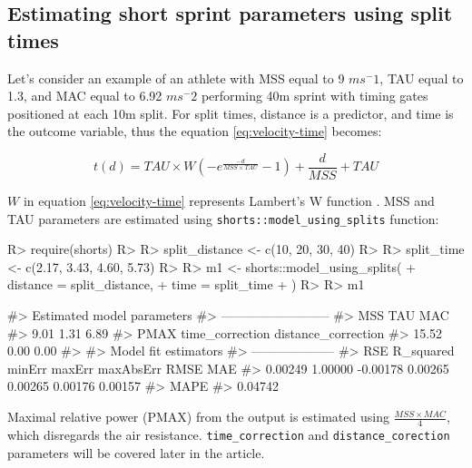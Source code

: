 \documentclass[
]{jss}
\begin{document}
\hypertarget{estimating-short-sprint-parameters-using-split-times}{%
\subsection{Estimating short sprint parameters using split times}\label{estimating-short-sprint-parameters-using-split-times}}

Let's consider an example of an athlete with MSS equal to 9 \(ms^-1\), TAU equal to 1.3, and MAC equal to 6.92 \(ms^-2\) performing 40m sprint with timing gates positioned at each 10m split. For split times, distance is a predictor, and time is the outcome variable, thus the equation \eqref{eq:velocity-time} becomes:

\begin{equation}
  t(d) = TAU \times W(-e^{\frac{-d}{MSS \times TAU}} - 1) + \frac{d}{MSS} + TAU \label{eq:time-distance}
\end{equation}

\(W\) in equation \eqref{eq:velocity-time} represents Lambert's W function \citep{R-LambertW}. MSS and TAU parameters are estimated using \texttt{shorts::model\_using\_splits} function:

\begin{CodeChunk}
\begin{CodeInput}
R> require(shorts)
R> 
R> split_distance <- c(10, 20, 30, 40)
R> 
R> split_time <- c(2.17, 3.43, 4.60, 5.73)
R> 
R> m1 <- shorts::model_using_splits(
+   distance = split_distance,
+   time = split_time
+ )
R> 
R> m1
\end{CodeInput}
\begin{CodeOutput}
#> Estimated model parameters
#> --------------------------
#>                 MSS                 TAU                 MAC 
#>                9.01                1.31                6.89 
#>                PMAX     time_correction distance_correction 
#>               15.52                0.00                0.00 
#> 
#> Model fit estimators
#> --------------------
#>       RSE R_squared    minErr    maxErr maxAbsErr      RMSE       MAE 
#>   0.00249   1.00000  -0.00178   0.00265   0.00265   0.00176   0.00157 
#>      MAPE 
#>   0.04742
\end{CodeOutput}
\end{CodeChunk}

Maximal relative power (PMAX) from the output is estimated using \(\frac{MSS \times MAC}{4}\), which disregards the air resistance. \texttt{time\_correction} and \texttt{distance\_corection} parameters will be covered later in the article.
\end{document}
